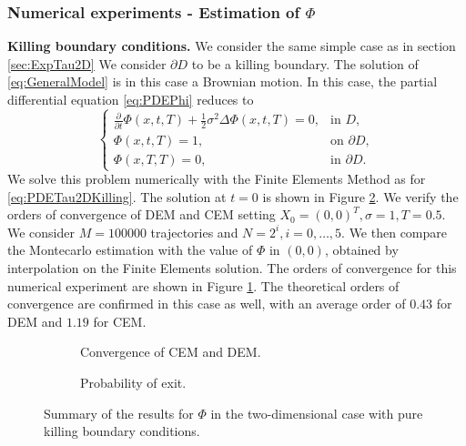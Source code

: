 \subsubsection{Numerical experiments - Estimation of $\Phi$}

\textbf{Killing boundary conditions.} We consider the same simple case as in section \ref{sec:ExpTau2D} We consider $\partial D$ to be a killing boundary. The solution of \eqref{eq:GeneralModel} is in this case a Brownian motion. In this case, the partial differential equation \eqref{eq:PDEPhi} reduces to
\begin{equation}\label{eq:PDEPhi2DKilling}
\begin{cases}
	\frac{\partial}{\partial t} \Phi(x,t,T) + \frac{1}{2} \sigma^2 \Delta \Phi(x,t,T) = 0, & \text{in } D, \\
	\Phi(x,t,T) = 1, & \text{on } \partial D, \\
	\Phi(x,T,T) = 0, & \text{in } \partial D.
\end{cases}
\end{equation}
We solve this problem numerically with the Finite Elements Method as for \eqref{eq:PDETau2DKilling}. The solution at $t = 0$ is shown in Figure \ref{fig:PhiExact2DKill}. We verify the orders of convergence of DEM and CEM setting $X_0 = (0,0)^T , \sigma = 1, T = 0.5$. We consider $M = 100000$ trajectories and $N = 2^i,i=0,\dots,5$. We then compare the Montecarlo estimation with the value of $\Phi$ in $(0,0)$, obtained by interpolation on the Finite Elements solution. The orders of convergence for this numerical experiment are shown in Figure \ref{fig:KillTwoDPhi}. The theoretical orders of convergence are confirmed in this case as well, with an average order of $0.43$ for DEM and $1.19$ for CEM.

\begin{figure}[t]
    \centering
    \begin{subfigure}{0.49\linewidth}
        \centering
        \resizebox{1\linewidth}{!}{ }  
        \caption{Convergence of CEM and DEM.}
        \label{fig:KillTwoDPhi}
    \end{subfigure}
    \begin{subfigure}{0.49\linewidth}
        \centering
        \resizebox{1\linewidth}{!}{ }  
        \caption{Probability of exit.}
        \label{fig:PhiExact2DKill}
    \end{subfigure}    
    \caption{Summary of the results for $\Phi$ in the two-dimensional case with pure killing boundary conditions.}
    \label{fig:OrdersTwoDKillPhi}
\end{figure}
